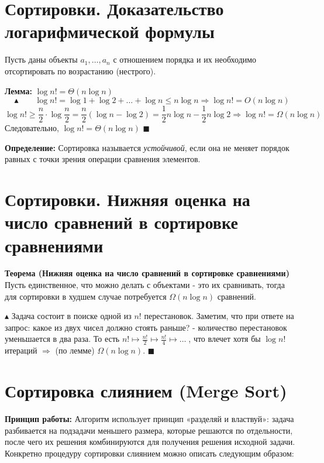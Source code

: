 \setcounter{section}{10}
\section{Сортировки. Доказательство логарифмической формулы}
\noindent Пусть даны объекты $a_1, \ldots, a_n$ с отношением порядка и их необходимо отсортировать по возрастанию (нестрого).
\\ \par \textbf{Лемма: } $\log{n!}=\Theta(n\log{n})$
$$\blacktriangle \qquad \log{n!}=\log{1}+\log{2}+\ldots+\log{n} \leq n\log{n} \Rightarrow \log{n!}=O(n\log{n})$$
$$\log{n!} \geq \frac{n}{2}\cdot \log{\frac{n}{2}} = \frac{n}{2}(\log{n} - \log{2}) = \frac{1}{2}n\log{n} - \frac{1}{2}n\log{2} \Rightarrow \log{n!}=\Omega(n\log{n})$$
Следовательно, $\log{n!}=\Theta(n\log{n})$ \quad $\blacksquare$

\par \textbf{Определение: } Сортировка называется \textit{устойчивой}, если она не меняет порядок равных с точки зрения операции сравнения элементов.

\section{Сортировки. Нижняя оценка на число сравнений в сортировке сравнениями}
\textbf{Теорема (Нижняя оценка на число сравнений в сортировке сравнениями)} Пусть единственное, что можно делать с объектами - это их сравнивать, тогда для сортировки в худшем случае потребуется $\Omega(n\log{n})$ сравнений.

\par $\blacktriangle$ Задача состоит в поиске одной из $n!$ перестановок. Заметим, что при ответе на запрос: какое из двух чисел должно стоять раньше? - количество перестановок уменьшается в два раза. То есть $n! \mapsto \frac{n!}{2} \mapsto \frac{n!}{4} \mapsto \ldots \;$, что влечет хотя бы $\log{n!}$ итераций $\Rightarrow$ (по лемме) $\Omega(n\log{n})$.  \quad $\blacksquare$

\setcounter{section}{12}
\section{Сортировка слиянием (Merge Sort)}

\par \textbf{Принцип работы: } Алгоритм использует принцип «разделяй и властвуй»: задача разбивается на подзадачи меньшего размера, которые решаются по отдельности, после чего их решения комбинируются для получения решения исходной задачи. Конкретно процедуру сортировки слиянием можно описать следующим образом:

